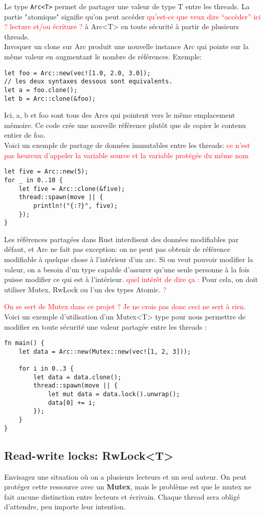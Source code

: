 \documentclass{article}
\newcommand{\TODO}[1]{\textcolor{red}{#1}}
\begin{document}
Le type \lstinline!Arc<T>!  permet de partager une valeur de type T  entre les threads.
La partie "atomique" signifie qu’on peut accéder \TODO{qu'est-ce que veux dire ``accèder'' ici ? lecture et/ou écriture ?} à Arc<T> en toute sécurité à partir de plusieurs threads. \\
Invoquer un clone sur Arc produit une nouvelle instance Arc qui pointe sur la même valeur en augmentant le nombre de références.
Exemple: 
\begin{lstlisting}
let foo = Arc::new(vec![1.0, 2.0, 3.0]);
// les deux syntaxes dessous sont equivalents.
let a = foo.clone();
let b = Arc::clone(&foo);
\end{lstlisting}
Ici, a, b et foo sont tous des Arcs qui pointent vers le même emplacement mémoire.
Ce code crée une nouvelle référence plutôt que de copier le contenu entier de foo.\\
Voici un exemple de partage de données immutables entre les threads: \TODO{ce n'est pas heureux d'appeler la variable source et la variable protégée du même nom}
\begin{lstlisting}
let five = Arc::new(5);
for _ in 0..10 {
    let five = Arc::clone(&five);
    thread::spawn(move || {
        println!("{:?}", five);
    });
}
\end{lstlisting}
Les références partagées dans Rust interdisent des données modifiables par défaut, et Arc ne fait pas exception: on ne peut pas obtenir de référence modifiable à quelque chose à l'intérieur d'un arc.
Si on veut pouvoir modifier la valeur, on a besoin d’un type capable d’assurer qu’une seule personne à la fois puisse modifier ce qui est à l’intérieur. \TODO{quel intérêt de dire ça :} Pour cela, on doit utiliser Mutex, RwLock ou l’un des types Atomic. \TODO{?}

\TODO{On se sert de Mutex dans ce projet ? Je ne crois pas donc ceci ne sert à rien.} Voici un exemple d'utilisation d'un Mutex<T> type pour nous permettre de modifier en toute sécurité une valeur partagée entre les threads :
\begin{lstlisting}
fn main() {
    let data = Arc::new(Mutex::new(vec![1, 2, 3]));

    for i in 0..3 {
        let data = data.clone();
        thread::spawn(move || {
            let mut data = data.lock().unwrap();
            data[0] += i;
        });
    }
}
\end{lstlisting}
\subsection{Read-write locks: RwLock<T>}
Envisagez une situation où on a plusieurs lecteurs et un seul auteur. On peut protéger cette ressource avec un \textbf{Mutex}, mais le problème est que le mutex ne fait aucune distinction entre lecteurs et écrivain.
Chaque thread sera obligé d'attendre, peu importe  leur intention.
\end{document}
